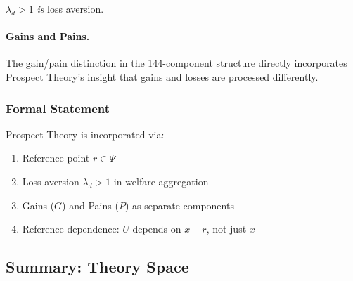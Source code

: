 $\lambda_d > 1$ \emph{is} loss aversion.

\paragraph{Gains and Pains.}
The gain/pain distinction in the 144-component structure directly incorporates
Prospect Theory's insight that gains and losses are processed differently.

\subsubsection{Formal Statement}

\begin{proposition}
Prospect Theory is incorporated via:
\begin{enumerate}
  \item Reference point $r \in \Psi$
  \item Loss aversion $\lambda_d > 1$ in welfare aggregation
  \item Gains ($G$) and Pains ($P$) as separate components
  \item Reference dependence: $U$ depends on $x - r$, not just $x$
\end{enumerate}
\end{proposition}

\subsection{Summary: Theory Space}
\label{app:theoryspace}

